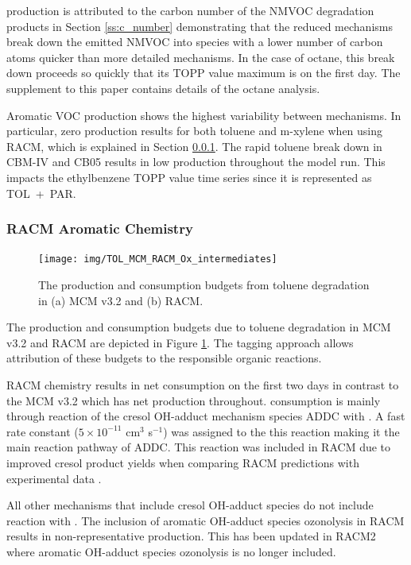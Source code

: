  production is attributed to the carbon number of the NMVOC degradation products in Section \ref{ss:c_number} demonstrating that the reduced mechanisms break down the emitted NMVOC into species with a lower number of carbon atoms quicker than more detailed mechanisms. 
In the case of octane, this break down proceeds so quickly that its TOPP value maximum is on the first day. 
The supplement to this paper contains details of the octane analysis.

Aromatic VOC  production shows the highest variability between mechanisms. 
In particular, zero  production results for both toluene and m-xylene when using RACM, which is explained in Section \ref{sss:RACM_aromatic}. 
The rapid toluene break down in CBM-IV and CB05 results in low  production throughout the model run.
This impacts the ethylbenzene TOPP value time series since it is represented as \mbox{TOL + PAR}.

\subsubsection{RACM Aromatic Chemistry} \label{sss:RACM_aromatic}

\begin{figure}
    \begin{center}
        \texttt{[image: img/TOL\_MCM\_RACM\_Ox\_intermediates]}
    \end{center}
    \caption{The  production and consumption budgets from toluene degradation in (a) MCM v3.2 and (b) RACM.}
    \label{f:TOL_MCM_RACM}
\end{figure}

The  production and consumption budgets due to toluene degradation in MCM v3.2 and RACM are depicted in Figure \ref{f:TOL_MCM_RACM}. 
The tagging approach allows attribution of these budgets to the responsible organic reactions.

RACM chemistry results in net  consumption on the first two days in contrast to the MCM v3.2 which has net  production throughout. 
 consumption is mainly through reaction of the cresol OH-adduct mechanism species ADDC with . 
A fast rate constant ($5 \times 10^{-11}$ cm$^3$ s$^{-1}$) was assigned to the this reaction making it the main reaction pathway of ADDC. 
This reaction was included in RACM due to improved cresol product yields when comparing RACM predictions with experimental data \citep{Stockwell:1997}.

All other mechanisms that include cresol OH-adduct species do not include reaction with . 
The inclusion of aromatic OH-adduct species ozonolysis in RACM results in non-representative  production. 
This has been updated in RACM2 where aromatic OH-adduct species ozonolysis is no longer included.
